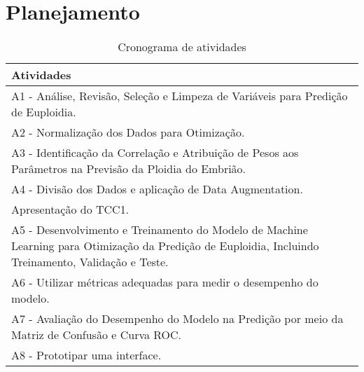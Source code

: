 \chapter[Planejamento]{Planejamento}

\begin{landscape}
    \begin{table}[ht]
        \centering
        \caption{Cronograma de atividades}
        \begin{tabular}{|l|}
        \hline
        \textbf{Atividades} \\ \hline
        A1 - Análise, Revisão, Seleção e Limpeza de Variáveis para Predição de Euploidia. \\ \hline
        A2 - Normalização dos Dados para Otimização. \\ \hline
        A3 - Identificação da Correlação e Atribuição de Pesos aos Parâmetros na Previsão da Ploidia do Embrião. \\ \hline
        A4 - Divisão dos Dados e aplicação de Data Augmentation. \\ \hline
        Apresentação do TCC1. \\ \hline
        A5 - Desenvolvimento e Treinamento do Modelo de Machine Learning para Otimização da Predição de Euploidia, Incluindo Treinamento, Validação e Teste. \\ \hline
        A6 - Utilizar métricas adequadas para medir o desempenho do modelo. \\ \hline
        A7 - Avaliação do Desempenho do Modelo na Predição por meio da Matriz de Confusão e Curva ROC. \\ \hline
        A8 - Prototipar uma interface. \\ \hline
        \end{tabular}
        \label{tab:cronograma}
    \end{table}
    \end{landscape}
    
